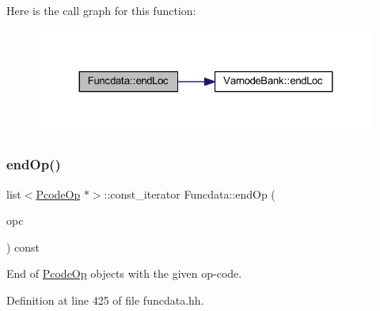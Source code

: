 Here is the call graph for this function\+:
\nopagebreak
\begin{figure}[H]
\begin{center}
\leavevmode
\includegraphics[width=324pt]{class_funcdata_addfc7faf2c1793283d70d16a2313416e_cgraph}
\end{center}
\end{figure}
\mbox{\label{class_funcdata_ad24461680d41c61349b3717283d8b854}} 
\subsubsection{\texorpdfstring{endOp()}{endOp()}\hspace{0.1cm}{\footnotesize\ttfamily [1/2]}}
{\footnotesize\ttfamily list$<$\mbox{\hyperlink{class_pcode_op}{Pcode\+Op}} $\ast$$>$\+::const\+\_\+iterator Funcdata\+::end\+Op (\begin{DoxyParamCaption}\item[{\mbox{\hyperlink{opcodes_8hh_abeb7dfb0e9e2b3114e240a405d046ea7}{Op\+Code}}}]{opc }\end{DoxyParamCaption}) const\hspace{0.3cm}{\ttfamily [inline]}}



End of \mbox{\hyperlink{class_pcode_op}{Pcode\+Op}} objects with the given op-\/code. 



Definition at line 425 of file funcdata.\+hh.

